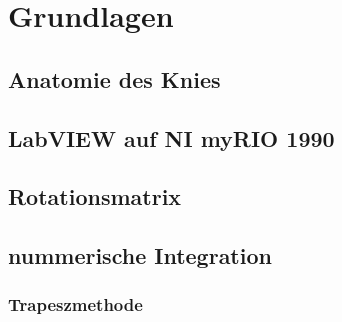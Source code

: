 %
%
\chapter{Grundlagen}\label{ch:grundlagen}
\section{Anatomie des Knies}
\section{LabVIEW auf NI myRIO 1990}
\section{Rotationsmatrix}
\section{nummerische Integration}
\subsection{Trapeszmethode}